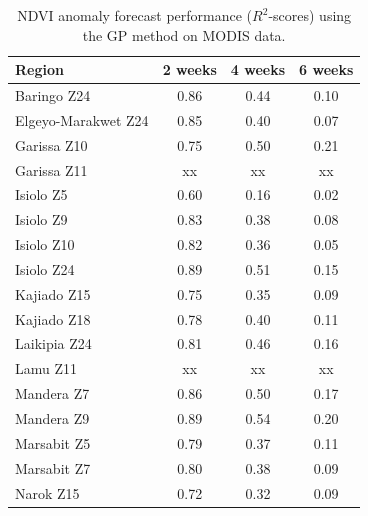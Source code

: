 \documentclass[review]{elsarticle}
\begin{document}

\begin{table}
	\footnotesize
	\caption{NDVI anomaly forecast performance ($R^2$-scores) using the GP method on MODIS data.} \label{tab:NDVI_GPM}
	\centering
	\begin{tabular}{l|ccc} 
		\toprule
		\textbf{Region}  &  \textbf{2 weeks} &  \textbf{4 weeks}  & \textbf{6 weeks}  \\
		\midrule
		Baringo Z24 &  0.86 &  0.44 & 0.10 \\
		Elgeyo-Marakwet Z24 &  0.85 &  0.40 & 0.07 \\
		Garissa Z10 &  0.75 &  0.50 & 0.21 \\
		Garissa Z11 & xx & xx &  xx \\
		Isiolo Z5 &  0.60 &  0.16 & 0.02 \\
		Isiolo Z9 &  0.83 &  0.38 & 0.08 \\
		Isiolo Z10 &  0.82 &  0.36 & 0.05 \\
		Isiolo Z24 &  0.89 &  0.51 & 0.15 \\
		Kajiado Z15 &  0.75 &  0.35 & 0.09 \\
		Kajiado Z18 &  0.78 &  0.40 & 0.11 \\
		Laikipia Z24 &  0.81 &  0.46 & 0.16 \\
		Lamu Z11 &  xx &  xx &  xx\\
		Mandera Z7 &  0.86 &  0.50 & 0.17 \\
		Mandera Z9 &  0.89 &  0.54 & 0.20 \\
		Marsabit Z5 &  0.79 &  0.37 & 0.11 \\
		Marsabit Z7 &  0.80 &  0.38 & 0.09 \\
		Narok Z15 &  0.72 &  0.32 & 0.09 \\

\end{tabular}
\end{table}
\end{document}
